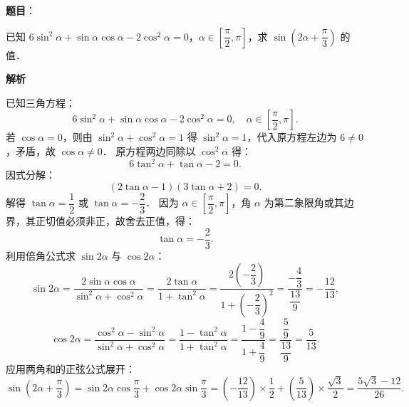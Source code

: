 \begin{answer}

\textbf{题目}：

已知 $6\sin^2\alpha + \sin\alpha\cos\alpha - 2\cos^2\alpha = 0$，$\alpha \in \left[\dfrac{\pi}{2}, \pi\right]$，求 $\sin\left(2\alpha + \dfrac{\pi}{3}\right)$ 的值．

\textbf{解析}

已知三角方程：
\nopagebreak[4]
\[
6\sin^2\alpha + \sin\alpha\cos\alpha - 2\cos^2\alpha = 0, \quad \alpha \in \left[\frac{\pi}{2}, \pi\right].
\]
若 $\cos\alpha = 0$，则由 $\sin^2\alpha + \cos^2\alpha = 1$ 得 $\sin^2\alpha = 1$，代入原方程左边为 $6 \neq 0$，矛盾，故 $\cos\alpha \neq 0$．
原方程两边同除以 $\cos^2\alpha$ 得：
\nopagebreak[4]
\[
6\tan^2\alpha + \tan\alpha - 2 = 0.
\]
因式分解：
\nopagebreak[4]
\[
(2\tan\alpha - 1)(3\tan\alpha + 2) = 0.
\]
解得 $\tan\alpha = \dfrac{1}{2}$ 或 $\tan\alpha = -\dfrac{2}{3}$．
因为 $\alpha \in \left[\dfrac{\pi}{2}, \pi\right]$，角 $\alpha$ 为第二象限角或其边界，其正切值必须非正，故舍去正值，得：
\nopagebreak[4]
\[
\tan\alpha = -\frac{2}{3}.
\]
利用倍角公式求 $\sin 2\alpha$ 与 $\cos 2\alpha$：
\nopagebreak[4]
\[
\sin 2\alpha = \frac{2\sin\alpha\cos\alpha}{\sin^2\alpha + \cos^2\alpha} = \frac{2\tan\alpha}{1 + \tan^2\alpha} = \frac{2\left(-\dfrac{2}{3}\right)}{1 + \left(-\dfrac{2}{3}\right)^2} = \frac{-\dfrac{4}{3}}{\dfrac{13}{9}} = -\frac{12}{13},
\]
\nopagebreak[4]
\[
\cos 2\alpha = \frac{\cos^2\alpha - \sin^2\alpha}{\sin^2\alpha + \cos^2\alpha} = \frac{1 - \tan^2\alpha}{1 + \tan^2\alpha} = \frac{1 - \dfrac{4}{9}}{1 + \dfrac{4}{9}} = \frac{\dfrac{5}{9}}{\dfrac{13}{9}} = \frac{5}{13}.
\]
应用两角和的正弦公式展开：
\nopagebreak[4]
\[
\sin\left(2\alpha + \frac{\pi}{3}\right) = \sin 2\alpha \cos\frac{\pi}{3} + \cos 2\alpha \sin\frac{\pi}{3} = \left(-\frac{12}{13}\right) \times \frac{1}{2} + \left(\frac{5}{13}\right) \times \frac{\sqrt{3}}{2} = \frac{5\sqrt{3} - 12}{26}.
\]


\end{answer}

